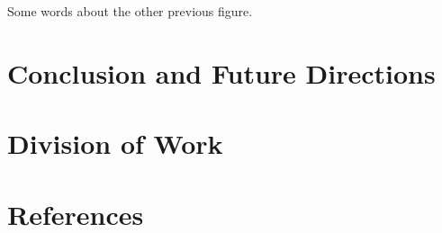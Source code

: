 \documentclass[11pt]{article}
\begin{document}
\begin{multicols}{2}

Some words about the other previous figure. 






\section{Conclusion and Future Directions}

\section{Division of Work}

\section{References}



\end{multicols}
\end{document}
